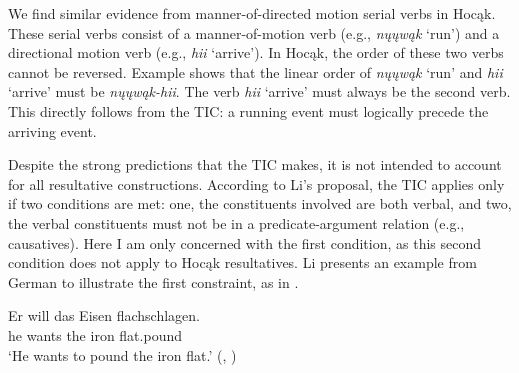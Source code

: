 \documentclass[output=paper]{LSP/langsci}
\begin{document}
We find similar evidence from manner-of-directed motion serial verbs in Hocąk. These serial verbs consist of a manner-of-motion verb (e.g., \textit{nųųwąk} `run') and a directional motion verb (e.g., \textit{hii} `arrive'). In Hocąk, the order of these two verbs cannot be reversed. Example  shows that the linear order of \textit{nųųwąk} `run' and \textit{hii} `arrive' must be \textit{nųųwąk-hii}. The verb \textit{hii} `arrive' must always be the second verb. This directly follows from the TIC: a running event must logically precede the arriving event.

\begin{exe}
\ex\label{ex:rosen:36}
\begin{xlist}



\end{xlist}
\end{exe}

Despite the strong predictions that the TIC makes, it is not intended to account for all resultative constructions. According to Li's proposal, the TIC applies only if two conditions are met: one, the constituents involved are both verbal, and two, the verbal constituents must not be in a predicate-argument relation (e.g., causatives). Here I am only concerned with the first condition, as this second condition does not apply to Hocąk resultatives. Li presents an example from German to illustrate the first constraint, as in .

\begin{exe}
\ex\label{ex:rosen:37}
 \gll Er will das Eisen flachschlagen.\\
he wants the iron flat.pound\\
\glt `He wants to pound the iron flat.' (\citealt[501]{Li1993}, )

\end{exe}
\end{document}

